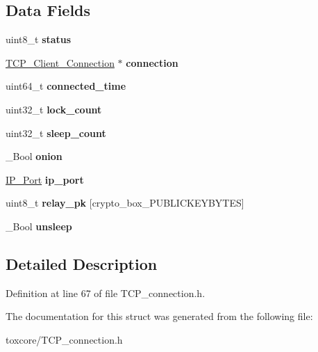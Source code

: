 \subsection*{Data Fields}
\begin{DoxyCompactItemize}
\item 
\hypertarget{struct_t_c_p__con_ade818037fd6c985038ff29656089758d}{uint8\+\_\+t {\bfseries status}}\label{struct_t_c_p__con_ade818037fd6c985038ff29656089758d}

\item 
\hypertarget{struct_t_c_p__con_a8ef08da0aa71c2a8a8d8bec587521844}{\hyperlink{struct_t_c_p___client___connection}{T\+C\+P\+\_\+\+Client\+\_\+\+Connection} $\ast$ {\bfseries connection}}\label{struct_t_c_p__con_a8ef08da0aa71c2a8a8d8bec587521844}

\item 
\hypertarget{struct_t_c_p__con_ae8be4bcb970c4f212e92c8f1598a1c41}{uint64\+\_\+t {\bfseries connected\+\_\+time}}\label{struct_t_c_p__con_ae8be4bcb970c4f212e92c8f1598a1c41}

\item 
\hypertarget{struct_t_c_p__con_af2d7f68891e20ea9070cfc2d412867e1}{uint32\+\_\+t {\bfseries lock\+\_\+count}}\label{struct_t_c_p__con_af2d7f68891e20ea9070cfc2d412867e1}

\item 
\hypertarget{struct_t_c_p__con_aa67ab512ed25830e7b9ea3c7069a9555}{uint32\+\_\+t {\bfseries sleep\+\_\+count}}\label{struct_t_c_p__con_aa67ab512ed25830e7b9ea3c7069a9555}

\item 
\hypertarget{struct_t_c_p__con_a4f1449619f7a2b76af07277f10bd0f93}{\+\_\+\+Bool {\bfseries onion}}\label{struct_t_c_p__con_a4f1449619f7a2b76af07277f10bd0f93}

\item 
\hypertarget{struct_t_c_p__con_a86e2a5a56c0dd22df6e8b8a10e40f9e4}{\hyperlink{struct_i_p___port}{I\+P\+\_\+\+Port} {\bfseries ip\+\_\+port}}\label{struct_t_c_p__con_a86e2a5a56c0dd22df6e8b8a10e40f9e4}

\item 
\hypertarget{struct_t_c_p__con_afd26506e572bfd335a3e7b498acd2902}{uint8\+\_\+t {\bfseries relay\+\_\+pk} \mbox{[}crypto\+\_\+box\+\_\+\+P\+U\+B\+L\+I\+C\+K\+E\+Y\+B\+Y\+T\+E\+S\mbox{]}}\label{struct_t_c_p__con_afd26506e572bfd335a3e7b498acd2902}

\item 
\hypertarget{struct_t_c_p__con_a32a5683291c18bbe710881445071d607}{\+\_\+\+Bool {\bfseries unsleep}}\label{struct_t_c_p__con_a32a5683291c18bbe710881445071d607}

\end{DoxyCompactItemize}


\subsection{Detailed Description}


Definition at line 67 of file T\+C\+P\+\_\+connection.\+h.



The documentation for this struct was generated from the following file\+:\begin{DoxyCompactItemize}
\item 
toxcore/T\+C\+P\+\_\+connection.\+h\end{DoxyCompactItemize}
